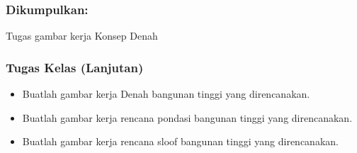 \documentclass[../skb.tex]{subfiles}
\begin{document}
\begin{frame}[mytitle=standard,c,mycolor=digiPH_uniblue,light]
	\frametitle{Dikumpulkan:}

	\tabitem \Huge Tugas gambar kerja Konsep Denah \normalsize


\end{frame}

\begin{frame}[mytitle=standard,t,mycolor=digiPH_uniblue,light]
	\frametitle{Tugas Kelas (Lanjutan)}
	\begin{itemize}
		\item Buatlah gambar kerja \Huge Denah \normalsize bangunan tinggi yang direncanakan.
		\item Buatlah gambar kerja \Huge rencana pondasi \normalsize bangunan tinggi yang direncanakan.
		\item Buatlah gambar kerja \Huge rencana sloof \normalsize bangunan tinggi yang direncanakan.
	\end{itemize}

\end{frame}
\end{document}
